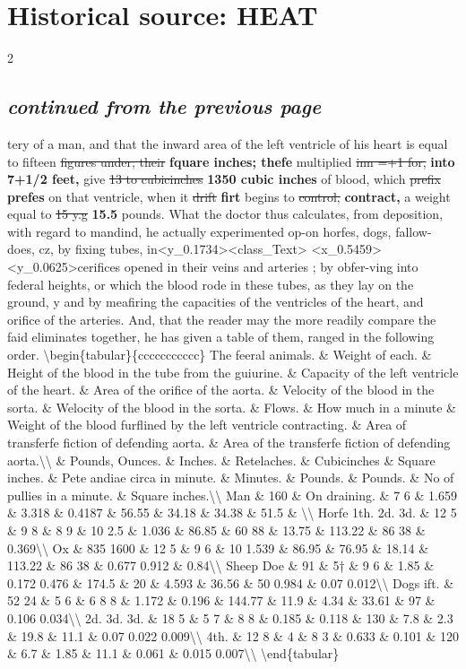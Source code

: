 \documentclass[10pt]{article}
\begin{document}
\section*{Historical source: HEAT}
\begin{multicols}{2}
\subsection*{\textit{continued from the previous page}}
tery of a man, and that the inward area of the left ventricle of his heart is equal to fifteen \sout{figures under; their} \textbf{fquare inches; thefe} multiplied \sout{inn =+1 for,} \textbf{into 7+1/2 feet,} give \sout{13 to cubicinches} \textbf{1350 cubic inches} of blood, which \sout{prefix} \textbf{prefes} on that ventricle, when it \sout{drift} \textbf{firt} begins to \sout{control,} \textbf{contract,} a weight equal to \sout{15 y.g} \textbf{15.5} pounds. What the doctor thus calculates, from deposition, with regard to mandind, he actually experimented op-on horfes, dogs, fallow-does, cz, by fixing tubes, in<y\_0.1734><class\_Text> <x\_0.5459><y\_0.0625>cerifices opened in their veins and arteries ; by obfer-ving into federal heights, or which the blood rode in these tubes, as they lay on the ground, y and by meafiring the capacities of the ventricles of the heart, and orifice of the arteries. And, that the reader may the more readily compare the faid eliminates together, he has given a table of them, ranged in the following order. \textbackslash{}begin\{tabular\}\{ccccccccccc\} The feeral animals. \& Weight of each. \& Height of the blood in the tube from the guiurine. \& Capacity of the left ventricle of the heart. \& Area of the orifice of the aorta. \& Velocity of the blood in the sorta. \& Welocity of the blood in the sorta. \& Flows. \& How much in a minute \& Weight of the blood furflined by the left ventricle contracting. \& Area of transferfe fiction of defending aorta. \& Area of the transferfe fiction of defending aorta.\textbackslash{}\textbackslash{} \& Pounds, Ounces. \& Inches. \& Retelaches. \& Cubicinches \& Square inches. \& Pete andiae circa in minute. \& Minutes. \& Pounds. \& Pounds. \& No of pullies in a minute. \& Square inches.\textbackslash{}\textbackslash{} Man \& 160 \& On draining. \& 7 6 \& 1.659 \& 3.318 \& 0.4187 \& 56.55 \& 34.18 \& 34.38 \& 51.5 \& \textbackslash{}\textbackslash{} Horfe 1th. 2d. 3d. \& 12 5 \& 9 8 \& 8 9 \& 10 2.5 \& 1.036 \& 86.85 \& 60 88 \& 13.75 \& 113.22 \& 86 38 \& 0.369\textbackslash{}\textbackslash{} Ox \& 835 1600 \& 12 5 \& 9 6 \& 10 1.539 \& 86.95 \& 76.95 \& 18.14 \& 113.22 \& 86 38 \& 0.677 0.912 \& 0.84\textbackslash{}\textbackslash{} Sheep Doe \& 91 \& 5† \& 9 6 \& 1.85 \& 0.172 0.476 \& 174.5 \& 20 \& 4.593 \& 36.56 \& 50 0.984 \& 0.07 0.012\textbackslash{}\textbackslash{} Dogs ift. \& 52 24 \& 5 6 \& 6 8 8 \& 1.172 \& 0.196 \& 144.77 \& 11.9 \& 4.34 \& 33.61 \& 97 \& 0.106 0.034\textbackslash{}\textbackslash{} 2d. 3d. 3d. \& 18 5 \& 5 7 \& 8 8 \& 0.185 \& 0.118 \& 130 \& 7.8 \& 2.3 \& 19.8 \& 11.1 \& 0.07 0.022 0.009\textbackslash{}\textbackslash{} 4th. \& 12 8 \& 4 \& 8 3 \& 0.633 \& 0.101 \& 120 \& 6.7 \& 1.85 \& 11.1 \& 0.061 \& 0.015 0.007\textbackslash{}\textbackslash{} \textbackslash{}end\{tabular\}


\end{multicols}
\end{document}
